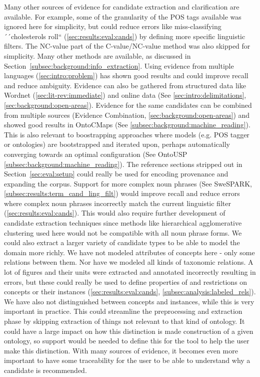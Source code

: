 \documentclass[a4paper]{report}
\begin{document}
Many other sources of evidence for candidate extraction and clarification are available.
For example, some of the granularity of the POS tags available was ignored here for simplicity, but could reduce errors like miss-classifying ´´cholesterols roll`` (\ref{sec:results:eval:cands}) by defining more specific linguistic filters.
The NC-value part of the C-value/NC-value method was also skipped for simplicity.
Many other methods are available, as discussed in Section~\ref{subsec:background:info_extraction}.
Using evidence from multiple languages (\ref{sec:intro:problem}) has shown good results and could improve recall and reduce ambiguity.
Evidence can also be gathered from structured data like Wordnet (\ref{sec:lit-rev:immediate}) and online data (See \ref{sec:intro:delimitations}, \ref{sec:background:open-areas}).
Evidence for the same candidates can be combined from multiple sources (Evidence Combination, \ref{sec:background:open-areas}) and showed good results in OntoCMaps (See \ref{subsec:background:machine_reading}).
This is also relevant to boostrapping approaches where models (e.g. POS tagger or ontologies) are bootstrapped and iterated upon, perhaps automatically converging towards an optimal configuration  (See OntoUSP \ref{subsec:background:machine_reading}).
The reference sections stripped out in Section~\ref{sec:eval:setup} could really be used for encoding provenance and expanding the corpus.
Support for more complex noun phrases (See SweSPARK, \ref{subsec:results:term_cand_ling_filt}) would improve recall and reduce errors where complex noun phrases incorrectly match the current linguistic filter (\ref{sec:results:eval:cands}).
This would also require further development of candidate extraction techniques since methods like hierarchical agglomerative clustering used here would not be compatible with all noun phrase forms.
We could also extract a larger variety of candidate types to be able to model the domain more richly.
We have not modeled attributes of concepts here - only some relations between them.
Nor have we modeled all kinds of taxonomic relations.
A lot of figures and their units were extracted and annotated incorrectly resulting in errors, but these could really be used to define properties of and restrictions on concepts or their instances (\ref{sec:results:eval:cands}, \ref{subsec:analysis:labeled_rels}).
We have also not distinguished between concepts and instances, while this is very important in practice.
This could streamline the preprocessing and extraction phase by skipping extraction of things not relevant to that kind of ontology.
It could have a large impact on how this distinction is made construction of a given ontology, so support would be needed to define this for the tool to help the user make this distinction.
With many sources of evidence, it becomes even more important to have some traceability for the user to be able to understand why a candidate is recommended.
\end{document}
